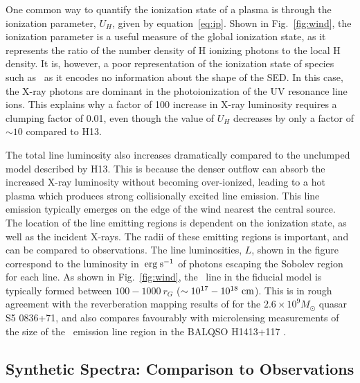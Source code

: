 One common way to quantify the ionization state of a plasma
is through the ionization parameter, $U_H$, given by equation~\ref{eq:ip}.
Shown in Fig.~\ref{fig:wind},
the ionization parameter is a useful measure of the global ionization state,
as it represents the ratio of the number density of 
H ionizing photons to the local H density.
It is, however, a poor representation of the 
ionization state of species such as \civ\ as it encodes no information
about the shape of the SED. In this case, the X-ray photons 
are dominant in the photoionization of the UV resonance line ions. 
This explains why a factor of 100 increase in X-ray luminosity requires
a clumping factor of 0.01, even though the value of $U_H$ decreases by only a factor of $\sim10$ compared to H13. 

The total line luminosity also increases dramatically compared to the unclumped model
described by H13. This is because the denser outflow can absorb the increased
X-ray luminosity without becoming over-ionized, leading to a hot plasma which
produces strong collisionally excited line emission.
This line emission typically emerges on the edge of the wind
nearest the central source. The location of the line emitting regions
is dependent on the ionization state, as well as the incident X-rays.
The radii of these emitting regions is important,
and can be compared to observations. The line luminosities, $L$,
shown in the figure correspond to the luminosity in $\:{\rm erg\:s^{-1}}$ of photons
escaping the Sobolev region for each line. 
As shown in Fig.~\ref{fig:wind},
the \civline\ line in the fiducial model is typically formed between 
$100-1000~r_G$ ($\sim10^{17}-10^{18}~\rm{cm}$).
This is in rough agreement with the reverberation mapping 
results of \cite{kaspi2007} 
for the $2.6\times10^{9} M_\odot$ quasar S5 0836+71,
and also compares favourably with microlensing measurements of the size of the
\civline\ emission line region in the BALQSO H1413+117 \citep{odowd2015}.

\subsection{Synthetic Spectra: Comparison to Observations}

